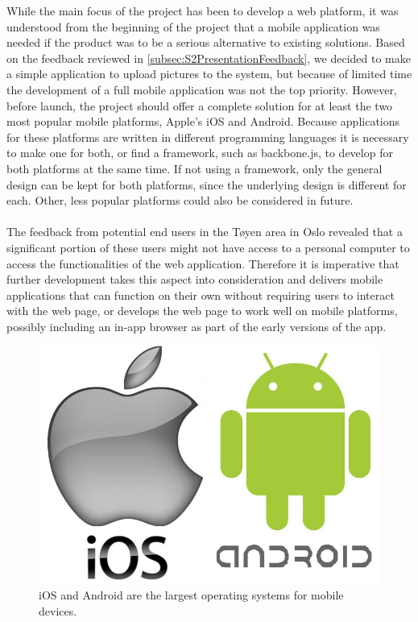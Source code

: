 While the main focus of the project has been to develop a web platform, it was understood from the beginning of the project that a mobile application was needed if the product was to be a serious alternative to existing solutions. Based on the feedback reviewed in \ref{subsec:S2PresentationFeedback}, we decided to make a simple application to upload pictures to the system, but because of limited time the development of a full mobile application was not the top priority. However, before launch,  the project should offer a complete solution for at least the two most popular mobile platforms, Apple's iOS and Android. Because applications for these platforms are written in different programming languages it is necessary to make one for both, or find a framework, such as backbone.js, to develop for both platforms at the same time. If not using a framework, only the general design can be kept for both platforms, since the underlying design is different for each. Other, less popular platforms could also be considered in future.
\paragraph{} The feedback from potential end users in the Tøyen area in Oslo revealed that a significant portion of these users might not have access to a personal computer to access the functionalities of the web application. Therefore it is imperative that further development takes this aspect into consideration and delivers mobile applications that can function on their own without requiring users to interact with the web page, or develops the web page to work well on mobile platforms, possibly including an in-app browser as part of the early versions of the app.

\begin{figure}[ht!]
  \centering
  \includegraphics[width=\linewidth]{./FurtherWork/img/iOSAndroid}
  \caption{iOS and Android are the largest operating systems for mobile devices.}
  \label{fig:FurtherIOSAndroidLogo}
\end{figure}

